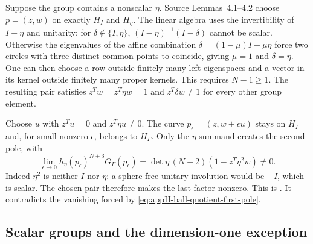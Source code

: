 Suppose the group contains a nonscalar $\eta$. Source
Lemmas~4.1--4.2 choose $p=(z,w)$ on exactly $H_I$ and
$H_\eta$. The linear algebra uses the invertibility of
$I-\eta$ and unitarity: for $\delta\notin\{I,\eta\}$,
$(I-\eta)^{-1}(I-\delta)$ cannot be scalar. Otherwise the
eigenvalues of the affine combination
$\delta=(1-\mu)I+\mu\eta$ force two circles with three
distinct common points to coincide, giving $\mu=1$ and
$\delta=\eta$. One can then choose a row outside finitely
many left eigenspaces and a vector in its kernel outside
finitely many proper kernels. This requires $N-1\geq1$.
The resulting pair satisfies
$z^Tw=z^T\eta w=1$ and $z^T\delta w\ne1$ for every other
group element.

Choose $u$ with $z^Tu=0$ and $z^T\eta u\ne0$.
The curve $p_\epsilon=(z,w+\epsilon u)$ stays on $H_I$ and,
for small nonzero $\epsilon$, belongs to $H_\Gamma$.
Only the $\eta$ summand creates the second pole, with
\begin{equation*}
 \lim_{\epsilon\to0}h_\eta(p_\epsilon)^{N+3}
                  G_\Gamma(p_\epsilon)
       =\det\eta\,(N+2)(1-z^T\eta^2w)\ne0.
 \tag{H.45}\label{eq:appH-ball-quotient-second-pole}
\end{equation*}
Indeed $\eta^2$ is neither $I$ nor $\eta$: a sphere-free
unitary involution would be $-I$, which is scalar.
The chosen pair therefore makes the last factor nonzero.
This is \cite[Proposition~4.3]{GangulySahi26BallQuotientsV1}.
It contradicts the vanishing forced by
\eqref{eq:appH-ball-quotient-first-pole}.

\subsection{Scalar groups and the dimension-one exception}
\label{sec:appH-ball-quotient-scalar}


